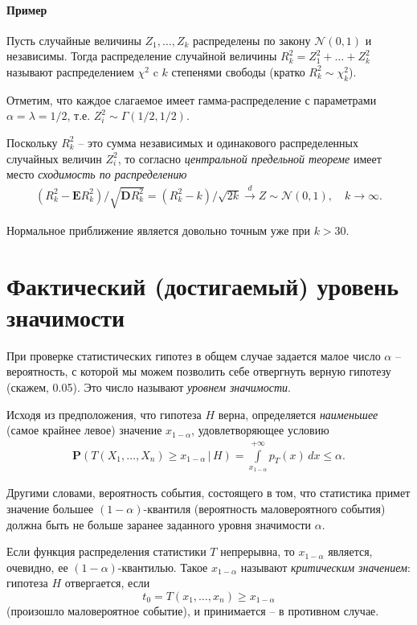 \documentclass[%
	11pt,
	a4paper,
	utf8,
		]{article}
\begin{document}
\paragraph{Пример} Пусть случайные величины $ Z_1, \dots, Z_k $ распределены по закону $ \mathcal{N}(0, 1) $ и независимы. Тогда распределение случайной величины $ R^2_k = Z_1^2 + \dots + Z_k^2 $ называют распределением $ \chi^2 $ c $ k $ степенями свободы (кратко $ R_k^2 \sim \chi_k^2 $).

Отметим, что каждое слагаемое имеет гамма-распределение с параметрами $ \alpha = \lambda = 1/2 $, т.е. $ Z_i^2 \sim \Gamma(1/2, 1/2) $. 

Поскольку $ R_k^2 $ -- это сумма независимых и одинакового распределенных случайных величин $ Z_i^2 $, то согласно \emph{центральной предельной теореме} имеет место \emph{сходимость по распределению}
\begin{align*}
	(R_k^2 - \mathbf{E}R_k^2) / \sqrt{\mathbf{D}R_k^2} = (R_k^2 - k)/\sqrt{2 k} \xrightarrow{d} Z \sim \mathcal{N}(0, 1), \quad k \to \infty.
\end{align*}

Нормальное приближение является довольно точным уже при $ k > 30 $.


\section{Фактический (достигаемый) уровень значимости}

При проверке статистических гипотез в общем случае задается малое число $ \alpha $ -- вероятность, с которой мы можем позволить себе отвергнуть верную гипотезу (скажем, 0.05). Это число называют \emph{уровнем значимости}.

Исходя из предположения, что гипотеза $ H $ верна, определяется \emph{наименьшее} (самое крайнее левое) значение $ x_{1 - \alpha} $, удовлетворяющее условию
\begin{align*}
	\mathbf{P}(T(X_1, \dots, X_n) \geqslant x_{1 - \alpha} \,|\, H) = \int\limits_{x_{1 - \alpha}}^{+\infty} p_T(x)\,dx \leqslant \alpha.
\end{align*}

Другими словами, вероятность события, состоящего в том, что статистика примет значение большее $ (1 - \alpha) $-квантиля (вероятность маловероятного события) должна быть не больше заранее заданного уровня значимости $ \alpha $.

Если функция распределения статистики $ T $ непрерывна, то $ x_{1 - \alpha} $ является, очевидно, ее $ (1 - \alpha) $-квантилью. Такое $ x_{1 - \alpha} $ называют \emph{критическим значением}: гипотеза $ H $ отвергается, если
$$ t_0 = T(x_1, \dots, x_n) \geqslant x_{1 - \alpha} $$ (произошло маловероятное событие), и принимается -- в противном случае.
\end{document}
